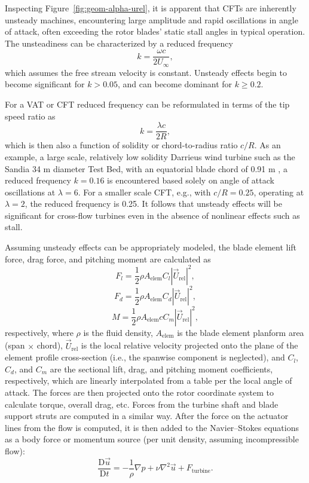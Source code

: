 \documentclass[times]{weauth}
\begin{document}
Inspecting Figure~\ref{fig:geom-alpha-urel}, it is apparent that CFTs are
inherently unsteady machines, encountering large amplitude and rapid
oscillations in angle of attack, often exceeding the rotor blades' static stall
angles in typical operation. The unsteadiness can be characterized by a reduced
frequency~\cite{Leishman2006}
\begin{equation}
    k = \frac{\omega c}{2 U_\infty},
\end{equation}
which assumes the free stream velocity is constant. Unsteady effects begin to
become significant for $k > 0.05$, and can become dominant for $k \ge 0.2$.

For a VAT or CFT reduced frequency can be reformulated in terms of the tip speed
ratio as
\begin{equation}
    k = \frac{\lambda c}{2R},
\end{equation}
which is then also a function of solidity or chord-to-radius ratio $c/R$. As an
example, a large scale, relatively low solidity Darrieus wind turbine such as
the Sandia 34 m diameter Test Bed, with an equatorial blade chord of 0.91 m
\cite{Murray2011}, a reduced frequency $k=0.16$ is encountered based solely on
angle of attack oscillations at $\lambda=6$. For a smaller scale CFT, e.g., with
$c/R = 0.25$, operating at $\lambda = 2$, the reduced frequency is 0.25. It
follows that unsteady effects will be significant for cross-flow turbines even
in the absence of nonlinear effects such as stall.

Assuming unsteady effects can be appropriately modeled, the blade element lift
force, drag force, and pitching moment are calculated as
\begin{equation}
    F_l = \frac{1}{2} \rho A_\mathrm{elem} C_l |\vec{U}_\mathrm{rel}|^2,
\end{equation}
\begin{equation}
    F_d = \frac{1}{2} \rho A_\mathrm{elem} C_d |\vec{U}_\mathrm{rel}|^2,
\end{equation}
\begin{equation}
    M = \frac{1}{2} \rho A_\mathrm{elem} c C_m |\vec{U}_\mathrm{rel}|^2,
\end{equation}
respectively, where $\rho$ is the fluid density, $A_\mathrm{elem}$ is the blade
element planform area (span $\times$ chord), $\vec{U}_\mathrm{rel}$ is the local
relative velocity projected onto the plane of the element profile cross-section
(i.e., the spanwise component is neglected), and $C_l$, $C_d$, and $C_m$ are the
sectional lift, drag, and pitching moment coefficients, respectively, which are
linearly interpolated from a table per the local angle of attack. The forces are
then projected onto the rotor coordinate system to calculate torque, overall
drag, etc. Forces from the turbine shaft and blade support struts are computed
in a similar way. After the force on the actuator lines from the flow is
computed, it is then added to the Navier--Stokes equations as a body force or
momentum source (per unit density, assuming incompressible flow):
\begin{equation}
    \frac{\mathrm{D} \vec{u}}{\mathrm{D} t} = - \frac{1}{\rho} \nabla p + \nu
    \nabla^2 \vec{u} + F_\mathrm{turbine}.
\end{equation}
\end{document}
